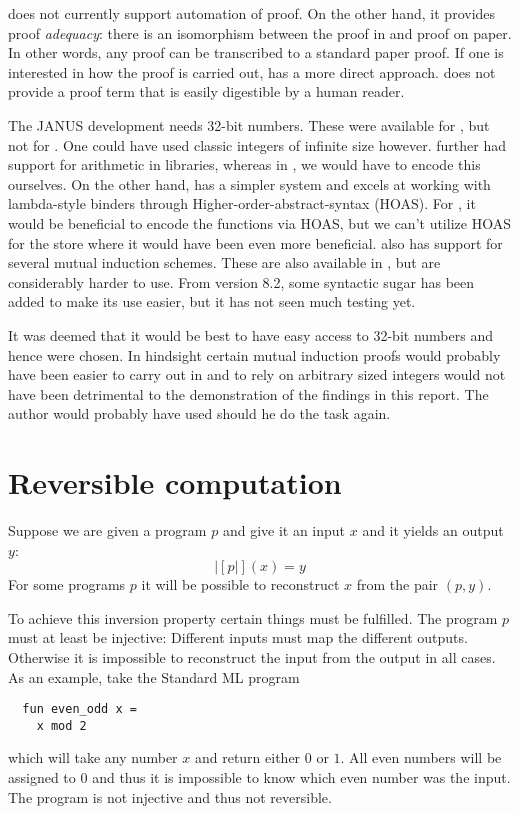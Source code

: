 \twelf{} does not currently support automation of proof. On the other
hand, it provides proof \emph{adequacy}: there is an isomorphism
between the proof in \twelf{} and proof on paper. In other words, any
proof can be transcribed to a standard paper proof. If one is
interested in how the proof is carried out, \twelf{} has a more direct
approach. \coq{} does not provide a proof term that is easily
digestible by a human reader.

The JANUS development needs 32-bit numbers. These were available for
\coq{}, but not for \twelf{}. One could have used classic integers of
infinite size however. \coq{} further had support for arithmetic in
libraries, whereas in \twelf{}, we would have to encode this
ourselves. On the other hand, \twelf{} has a simpler system and excels
at working with lambda-style binders through
Higher-order-abstract-syntax (HOAS). For \twelf{}, it would be
beneficial to encode the functions via HOAS, but we can't utilize HOAS
for the store where it would have been even more beneficial. \twelf{}
also has support for several mutual induction schemes. These are also
available in \coq{}, but are considerably harder to use. From \coq{}
version 8.2, some syntactic sugar has been added to make its
use easier, but it has not seen much testing yet.

It was deemed that it would be best to have easy access to 32-bit
numbers and hence \coq{} were chosen. In hindsight certain mutual
induction proofs would probably have been easier to carry out in
\twelf{} and to rely on arbitrary sized integers would not have been
detrimental to the demonstration of the findings in this report. The
author would probably have used \twelf{} should he do the task again.

\section{Reversible computation}
\label{sec:revers-comp}

Suppose we are given a program $p$ and give it an input $x$ and it
yields an output $y$:
\begin{equation*}
  |[p|](x) = y
\end{equation*}
For some programs $p$ it will be possible to reconstruct $x$ from the
pair $(p, y)$.

To achieve this inversion property certain things must be
fulfilled. The program $p$ must at least be injective: Different
inputs must map the different outputs. Otherwise it is impossible to
reconstruct the input from the output in all cases. As an example,
take the Standard ML program
\begin{verbatim}
  fun even_odd x =
    x mod 2
\end{verbatim}
which will take any number $x$ and return either $0$ or $1$. All even
numbers will be assigned to $0$ and thus it is impossible to know
which even number was the input. The program is not injective and thus
not reversible.

